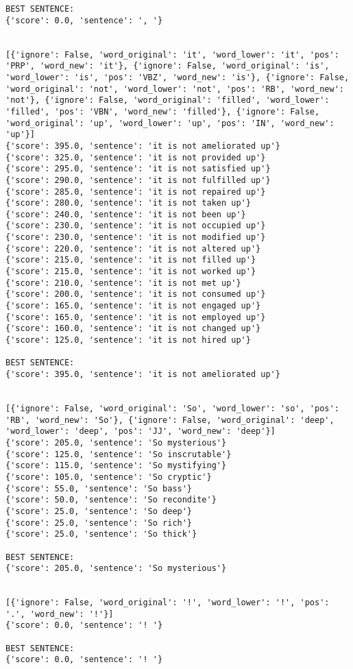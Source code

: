 \documentclass[12pt,a4paper,oneside]{book}
\begin{document}
\begin{verbatim}
BEST SENTENCE:
{'score': 0.0, 'sentence': ', '}


[{'ignore': False, 'word_original': 'it', 'word_lower': 'it', 'pos': 'PRP', 'word_new': 'it'}, {'ignore': False, 'word_original': 'is', 'word_lower': 'is', 'pos': 'VBZ', 'word_new': 'is'}, {'ignore': False, 'word_original': 'not', 'word_lower': 'not', 'pos': 'RB', 'word_new': 'not'}, {'ignore': False, 'word_original': 'filled', 'word_lower': 'filled', 'pos': 'VBN', 'word_new': 'filled'}, {'ignore': False, 'word_original': 'up', 'word_lower': 'up', 'pos': 'IN', 'word_new': 'up'}]
{'score': 395.0, 'sentence': 'it is not ameliorated up'}
{'score': 325.0, 'sentence': 'it is not provided up'}
{'score': 295.0, 'sentence': 'it is not satisfied up'}
{'score': 290.0, 'sentence': 'it is not fulfilled up'}
{'score': 285.0, 'sentence': 'it is not repaired up'}
{'score': 280.0, 'sentence': 'it is not taken up'}
{'score': 240.0, 'sentence': 'it is not been up'}
{'score': 230.0, 'sentence': 'it is not occupied up'}
{'score': 230.0, 'sentence': 'it is not modified up'}
{'score': 220.0, 'sentence': 'it is not altered up'}
{'score': 215.0, 'sentence': 'it is not filled up'}
{'score': 215.0, 'sentence': 'it is not worked up'}
{'score': 210.0, 'sentence': 'it is not met up'}
{'score': 200.0, 'sentence': 'it is not consumed up'}
{'score': 165.0, 'sentence': 'it is not engaged up'}
{'score': 165.0, 'sentence': 'it is not employed up'}
{'score': 160.0, 'sentence': 'it is not changed up'}
{'score': 125.0, 'sentence': 'it is not hired up'}

BEST SENTENCE:
{'score': 395.0, 'sentence': 'it is not ameliorated up'}


[{'ignore': False, 'word_original': 'So', 'word_lower': 'so', 'pos': 'RB', 'word_new': 'So'}, {'ignore': False, 'word_original': 'deep', 'word_lower': 'deep', 'pos': 'JJ', 'word_new': 'deep'}]
{'score': 205.0, 'sentence': 'So mysterious'}
{'score': 125.0, 'sentence': 'So inscrutable'}
{'score': 115.0, 'sentence': 'So mystifying'}
{'score': 105.0, 'sentence': 'So cryptic'}
{'score': 55.0, 'sentence': 'So bass'}
{'score': 50.0, 'sentence': 'So recondite'}
{'score': 25.0, 'sentence': 'So deep'}
{'score': 25.0, 'sentence': 'So rich'}
{'score': 25.0, 'sentence': 'So thick'}

BEST SENTENCE:
{'score': 205.0, 'sentence': 'So mysterious'}


[{'ignore': False, 'word_original': '!', 'word_lower': '!', 'pos': '.', 'word_new': '!'}]
{'score': 0.0, 'sentence': '! '}

BEST SENTENCE:
{'score': 0.0, 'sentence': '! '}



\end{verbatim}
\end{document}
